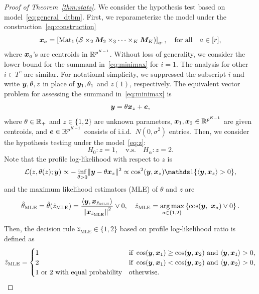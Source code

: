 \documentclass[lettersize,onecolumn,journal]{IEEEtran}
\theoremstyle{definition}
\theoremstyle{definition}
\newcommand{\of}[1]{\left(#1\right)}
\newcommand{\off}[1]{\left[#1\right]}
\newcommand{\offf}[1]{\left\{#1\right\}}
\begin{document}
\begin{proof}[Proof of Theorem~\ref{thm:stats}]
We consider the hypothesis test based on model~\eqref{eq:general_dtbm}. First, we reparameterize the model under the construction~\eqref{eq:construction}
\begin{equation}
    \mx_a = \off{\mat_1 \of{ \tS\times_2 \mM_2\times_3\cdots \times_K \mM_K  }}_{a:}, \quad \text{for all} \quad a \in [r],
\end{equation}
where $\bm x_a$'s are centroids in $\mathbb{R}^{p^{K-1}}$. Without loss of generality, we consider the lower bound for the summand in~\eqref{eq:minimax} for $i=1$. The analysis for other $i\in T^c$ are similar. For notational simplicity, we suppressed the subscript $i$ and write $\bm{y}, \theta, z$ in place of $\bm{y}_1, \theta_1$ and $z(1)$, respectively. The equivalent vector problem for assessing the summand in~\eqref{eq:minimax} is
\begin{equation}\label{eq:z}
\my=\theta\mx_{z}+\me,
\end{equation}
where $\theta\in\mathbb{R}_{+}$ and $z\in \{1,2\}$ are unknown parameters, $\bm x_1,\bm x_2\in\mathbb{R}^{p^{K-1}}$ are given centroids, and $\bm{e}\in\mathbb{R}^{p^{K-1}}$ consists of i.i.d.\ $N(0,\sigma^2)$ entries.  Then, we consider the hypothesis testing under the model~\eqref{eq:z}:
\begin{equation}\label{eq:test}
H_0\colon z=1, \quad \text{v.s.}\quad H_\alpha\colon z=2.
\end{equation}
Note that the profile log-likelihood with respect to $z$ is
\[
\tL(z,  \theta(z);\my)\propto - \inf_{\theta>0}\onormSize{}{\my- \theta\mx_{z}}^2 \propto  \cos^2(\my, \mx_{z}) \ind\{ \langle \my,\mx_{z}\rangle  >0 \}, 
\]
and the maximum likelihood estimators (MLE) of $\theta$ and $z$ are
\begin{equation}\label{eq:MLE}
    \hat \theta_{\text{MLE}}= \hat \theta(\hat z_{\text{MLE}})={\langle \my,\mx_{\hat z_{\text{MLE}}}\rangle \over \onorm{\mx_{\hat z_{\text{MLE}}}}^2}\vee 0 , \quad 
\hat z_{\text{MLE}}= \argmax_{a\in\{1,2\}} \offf{\cos(\my,\ \mx_a)\vee 0}. 
\end{equation}

Then, the decision rule $\hat z_{\text{MLE}} \in\{1,2\}$ based on profile log-likelihood ratio is defined as
\begin{equation}\label{eq:ratio}
\hat z_{\text{MLE}}=
\begin{cases}
1 & \text{if }\cos(\my,\mx_1)\geq  \cos(\my,\mx_2) \text{ and }\langle \my,\mx_1\rangle > 0, \\
2 & \text{if }\cos(\my,\mx_1)<\cos(\my,\mx_2) \text{ and }\langle \my,\mx_2\rangle > 0,\\
\text{1 or 2 with equal probability} & \text{otherwise.}
\end{cases}
\end{equation}


\end{proof}
\end{document}
